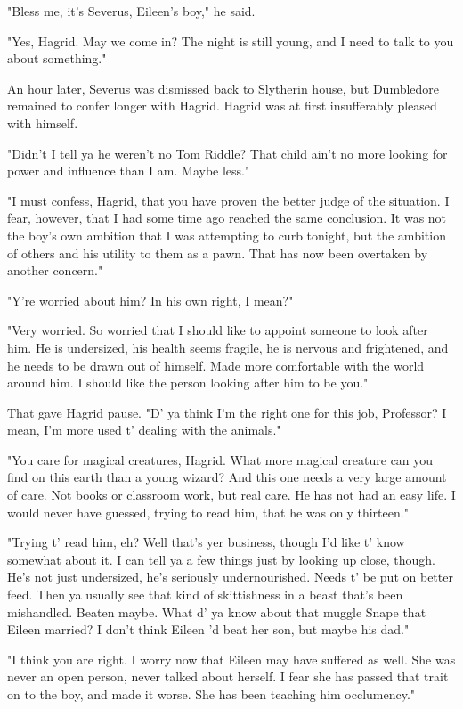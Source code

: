 \documentclass[a4paper,11pt]{article}
\begin{document}
"Bless me, it's Severus, Eileen's boy," he said.

"Yes, Hagrid. May we come in? The night is still young, and I need to talk to you about something."

An hour later, Severus was dismissed back to Slytherin house, but Dumbledore remained to confer longer with Hagrid. Hagrid was at first insufferably pleased with himself.

"Didn't I tell ya he weren't no Tom Riddle? That child ain't no more looking for power and influence than I am. Maybe less."

"I must confess, Hagrid, that you have proven the better judge of the situation. I fear, however, that I had some time ago reached the same conclusion. It was not the boy's own ambition that I was attempting to curb tonight, but the ambition of others and his utility to them as a pawn. That has now been overtaken by another concern."

"Y're worried about him? In his own right, I mean?"

"Very worried. So worried that I should like to appoint someone to look after him. He is undersized, his health seems fragile, he is nervous and frightened, and he needs to be drawn out of himself. Made more comfortable with the world around him. I should like the person looking after him to be you."

That gave Hagrid pause. "D' ya think I'm the right one for this job, Professor? I mean, I'm more used t' dealing with the animals."

"You care for magical creatures, Hagrid. What more magical creature can you find on this earth than a young wizard? And this one needs a very large amount of care. Not books or classroom work, but real care. He has not had an easy life. I would never have guessed, trying to read him, that he was only thirteen."

"Trying t' read him, eh? Well that's yer business, though I'd like t' know somewhat about it. I can tell ya a few things just by looking up close, though. He's not just undersized, he's seriously undernourished. Needs t' be put on better feed. Then ya usually see that kind of skittishness in a beast that's been mishandled. Beaten maybe. What d' ya know about that muggle Snape that Eileen married? I don't think Eileen 'd beat her son, but maybe his dad."

"I think you are right. I worry now that Eileen may have suffered as well. She was never an open person, never talked about herself. I fear she has passed that trait on to the boy, and made it worse. She has been teaching him occlumency."
\end{document}
